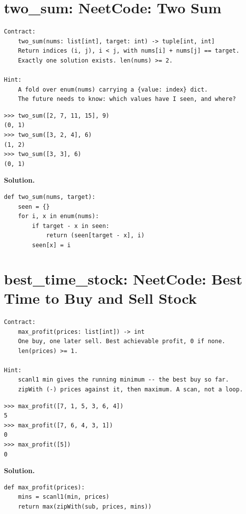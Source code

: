 \documentclass[10pt,letterpaper]{book}
\begin{document}
\section{two\_sum: NeetCode: Two Sum}
\begin{lstlisting}[style=ex]
Contract:
    two_sum(nums: list[int], target: int) -> tuple[int, int]
    Return indices (i, j), i < j, with nums[i] + nums[j] == target.
    Exactly one solution exists. len(nums) >= 2.

Hint:
    A fold over enum(nums) carrying a {value: index} dict.
    The future needs to know: which values have I seen, and where?
\end{lstlisting}
\begin{lstlisting}[style=ex]
>>> two_sum([2, 7, 11, 15], 9)
(0, 1)
>>> two_sum([3, 2, 4], 6)
(1, 2)
>>> two_sum([3, 3], 6)
(0, 1)
\end{lstlisting}
\noindent\textbf{Solution.}
\begin{lstlisting}[style=code]
def two_sum(nums, target):
    seen = {}
    for i, x in enum(nums):
        if target - x in seen:
            return (seen[target - x], i)
        seen[x] = i
\end{lstlisting}

\section{best\_time\_stock: NeetCode: Best Time to Buy and Sell Stock}
\begin{lstlisting}[style=ex]
Contract:
    max_profit(prices: list[int]) -> int
    One buy, one later sell. Best achievable profit, 0 if none.
    len(prices) >= 1.

Hint:
    scanl1 min gives the running minimum -- the best buy so far.
    zipWith (-) prices against it, then maximum. A scan, not a loop.
\end{lstlisting}
\begin{lstlisting}[style=ex]
>>> max_profit([7, 1, 5, 3, 6, 4])
5
>>> max_profit([7, 6, 4, 3, 1])
0
>>> max_profit([5])
0
\end{lstlisting}
\noindent\textbf{Solution.}
\begin{lstlisting}[style=code]
def max_profit(prices):
    mins = scanl1(min, prices)
    return max(zipWith(sub, prices, mins))
\end{lstlisting}
\end{document}
